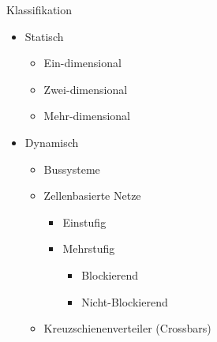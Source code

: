 \begin{defi}[Verbindungsnetzwerk]{Klassifikation}
    \begin{itemize}
        \item Statisch
        \begin{itemize}
            \item Ein-dimensional
            \item Zwei-dimensional
            \item Mehr-dimensional
        \end{itemize}
        \item Dynamisch
        \begin{itemize}
            \item Bussysteme 
            \item Zellenbasierte Netze
            \begin{itemize}
                \item Einstufig
                \item Mehrstufig
                \begin{itemize}
                    \item Blockierend
                    \item Nicht-Blockierend
                \end{itemize}
            \end{itemize}
            \item Kreuzschienenverteiler (Crossbars)
        \end{itemize}
    \end{itemize}
\end{defi}

